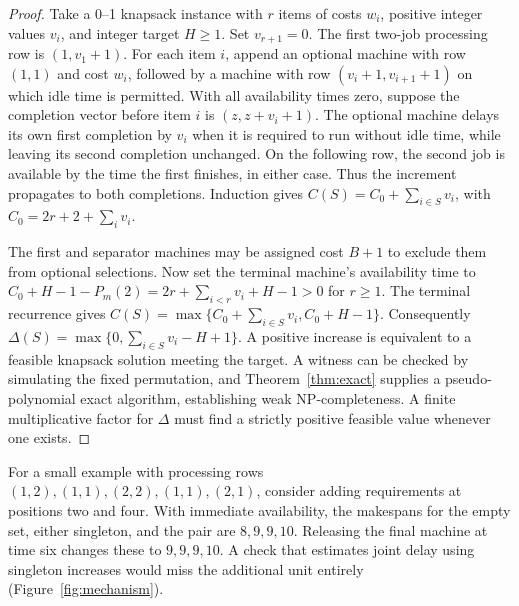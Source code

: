 \documentclass[11pt,letterpaper]{article}
\begin{document}
\begin{proof}
Take a 0--1 knapsack instance with $r$ items of costs $w_i$, positive integer values $v_i$, and integer target $H\ge 1$. Set $v_{r+1}=0$. The first two-job processing row is $(1,v_1+1)$. For each item $i$, append an optional machine with row $(1,1)$ and cost $w_i$, followed by a machine with row $(v_i+1,v_{i+1}+1)$ on which idle time is permitted. With all availability times zero, suppose the completion vector before item $i$ is $(z,z+v_i+1)$. The optional machine delays its own first completion by $v_i$ when it is required to run without idle time, while leaving its second completion unchanged. On the following row, the second job is available by the time the first finishes, in either case. Thus the increment propagates to both completions. Induction gives $C(S)=C_0+\sum_{i\in S}v_i$, with $C_0=2r+2+\sum_i v_i$.

The first and separator machines may be assigned cost $B+1$ to exclude them from optional selections. Now set the terminal machine's availability time to $C_0+H-1-P_m(2)=2r+\sum_{i<r}v_i+H-1>0$ for $r\ge 1$. The terminal recurrence gives $C(S)=\max\{C_0+\sum_{i\in S}v_i,C_0+H-1\}$. Consequently $\Delta(S)=\max\{0,\sum_{i\in S}v_i-H+1\}$. A positive increase is equivalent to a feasible knapsack solution meeting the target. A witness can be checked by simulating the fixed permutation, and Theorem~\ref{thm:exact} supplies a pseudo-polynomial exact algorithm, establishing weak NP-completeness. A finite multiplicative factor for $\Delta$ must find a strictly positive feasible value whenever one exists.
\end{proof}

For a small example with processing rows $(1,2),(1,1),(2,2),(1,1),(2,1)$, consider adding requirements at positions two and four. With immediate availability, the makespans for the empty set, either singleton, and the pair are $8,9,9,10$. Releasing the final machine at time six changes these to $9,9,9,10$. A check that estimates joint delay using singleton increases would miss the additional unit entirely (Figure~\ref{fig:mechanism}).
\end{document}
